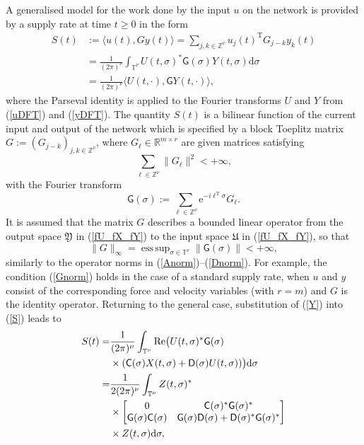 \documentclass[letterpaper, 10pt, conference]{ieeeconf}  %
\def\>{\geqslant}           %
\def\Re{\mathrm{Re}}   %
\def\mZ{\mathbb{Z}}    %
\def\mR{\mathbb{R}}    %
\def\rT{\mathrm{T}}        %
\def\bra{{\langle}}
\def\ket{{\rangle}}
\def\re{\mathrm{e}}        %
\def\rd{\mathrm{d}}        %
\def\x{\times}
\def\sC{\mathsf{C}}
\def\sD{\mathsf{D}}
\def\sG{\mathsf{G}}
\def\fU{\mathfrak{U}}
\def\sC{{\sf C}}
\def\fY{\mathfrak{Y}}
\def\mT{\mathbb{T}}
\def\mZ{\mathbb{Z}}
\def\esssup{\mathop{\mathrm{ess\, sup}}}    %
\begin{document}
A generalised model for the work done by the input $u$ on the network is provided by a supply rate \cite{W_1972} at time $t\>0$ in the form
\begin{align}
\nonumber
    S(t)&:=
    \bra
        u(t),Gy(t)
    \ket
    =
    \sum_{j,k\in \mZ^\nu}
    u_j(t)^{\rT}
    G_{j-k}
    y_k(t)\\
\nonumber
    & =
    \frac{1}
    {(2\pi)^{\nu}}
    \int_{\mT^\nu}
    U(t,\sigma)^*
    \sG(\sigma)
    Y(t,\sigma)
    \rd \sigma\\
\label{S}
    & =
    \frac{1}
    {(2\pi)^{\nu}}
    \bra
        U(t,\cdot),
        \sG Y(t,\cdot)
    \ket,
\end{align}
where the Parseval identity is applied to the Fourier transforms $U$ and $Y$ from (\ref{uDFT}) and (\ref{yDFT}).
The quantity $S(t)$ is a bilinear function of the current input and output of the network
which is specified by a block Toeplitz matrix $G:= (G_{j-k})_{j,k\in \mZ^\nu}$, where $G_\ell \in \mR^{m\x r}$ are given matrices satisfying
\begin{equation}
\label{Ggood}
  \sum_{\ell \in \mZ^\nu}
  \|G_\ell\|^2 < +\infty,
\end{equation}
with the Fourier transform
\begin{equation}
\label{cG}
    \sG(\sigma)
    :=
    \sum_{\ell\in \mZ^\nu}
    \re^{-i\ell^{\rT}\sigma}
    G_\ell.
\end{equation}
It is assumed that the matrix $G$ describes a bounded linear operator from the output space $\fY$ in (\ref{fU_fX_fY}) to the input space $\fU$ in (\ref{fU_fX_fY}), so that
\begin{equation}
\label{Gnorm}
    \|G\|_{\infty}
    =
    \esssup_{\sigma \in \mT^\nu}
    \|\sG(\sigma)\|
    <+\infty,
\end{equation}
similarly to the operator norms in (\ref{Anorm})--(\ref{Dnorm}).
For example, the condition (\ref{Gnorm}) holds in the
case of a standard supply rate, when $u$ and $y$ consist of the corresponding force and velocity variables (with $r=m$) and $G$ is the identity operator. Returning to the general case, substitution of (\ref{Y}) into (\ref{S}) leads to
\begin{align}
\nonumber
    S(t)
     =&
    \frac{1}
    {(2\pi)^{\nu}}
    \int_{\mT^\nu}
    \Re
    \big(
    U(t,\sigma)^*
    \sG(\sigma)\\
\nonumber
    & \x
    (\sC(\sigma) X(t,\sigma)+\sD(\sigma) U(t,\sigma))
    \big)
    \rd \sigma\\
\nonumber
    = &
    \frac{1}
    {2(2\pi)^{\nu}}
    \int_{\mT^\nu}
    Z(t,\sigma)^*\\
\nonumber
    & \x
    {\begin{bmatrix}
        0 & \sC(\sigma)^* \sG(\sigma)^*\\
        \sG(\sigma) \sC(\sigma) & \sG(\sigma) \sD(\sigma) + \sD(\sigma)^* \sG(\sigma)^*
    \end{bmatrix}}\\
\label{W1}
    & \x
    Z(t,\sigma)
    \rd \sigma,
\end{align}
\end{document}
